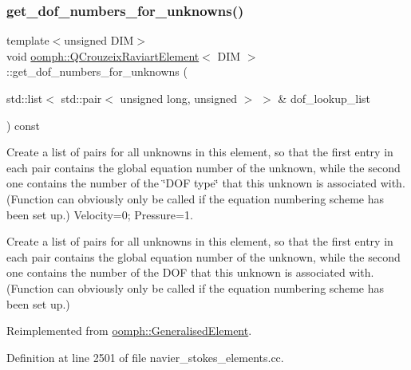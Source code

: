 \subsubsection{\texorpdfstring{get\+\_\+dof\+\_\+numbers\+\_\+for\+\_\+unknowns()}{get\_dof\_numbers\_for\_unknowns()}}
{\footnotesize\ttfamily template$<$unsigned D\+IM$>$ \\
void \hyperlink{classoomph_1_1QCrouzeixRaviartElement}{oomph\+::\+Q\+Crouzeix\+Raviart\+Element}$<$ D\+IM $>$\+::get\+\_\+dof\+\_\+numbers\+\_\+for\+\_\+unknowns (\begin{DoxyParamCaption}\item[{std\+::list$<$ std\+::pair$<$ unsigned long, unsigned $>$ $>$ \&}]{dof\+\_\+lookup\+\_\+list }\end{DoxyParamCaption}) const\hspace{0.3cm}{\ttfamily [virtual]}}



Create a list of pairs for all unknowns in this element, so that the first entry in each pair contains the global equation number of the unknown, while the second one contains the number of the \char`\"{}\+D\+O\+F type\char`\"{} that this unknown is associated with. (Function can obviously only be called if the equation numbering scheme has been set up.) Velocity=0; Pressure=1. 

Create a list of pairs for all unknowns in this element, so that the first entry in each pair contains the global equation number of the unknown, while the second one contains the number of the D\+OF that this unknown is associated with. (Function can obviously only be called if the equation numbering scheme has been set up.) 

Reimplemented from \hyperlink{classoomph_1_1GeneralisedElement_a069f59bfc3e607a5bebba52c6314d777}{oomph\+::\+Generalised\+Element}.



Definition at line 2501 of file navier\+\_\+stokes\+\_\+elements.\+cc.

\mbox{\label{classoomph_1_1QCrouzeixRaviartElement_ae57ed7defb77ccaa537a5d9caae68172}} 
